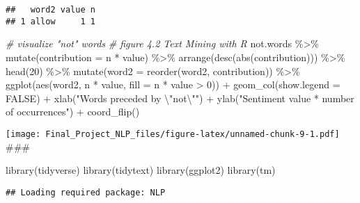 \documentclass[
]{article}
\newenvironment{Shaded}{\begin{snugshade}}{\end{snugshade}}
\newcommand{\AttributeTok}[1]{\textcolor[rgb]{0.77,0.63,0.00}{#1}}
\newcommand{\CommentTok}[1]{\textcolor[rgb]{0.56,0.35,0.01}{\textit{#1}}}
\newcommand{\ConstantTok}[1]{\textcolor[rgb]{0.00,0.00,0.00}{#1}}
\newcommand{\DecValTok}[1]{\textcolor[rgb]{0.00,0.00,0.81}{#1}}
\newcommand{\FunctionTok}[1]{\textcolor[rgb]{0.00,0.00,0.00}{#1}}
\newcommand{\NormalTok}[1]{#1}
\newcommand{\SpecialCharTok}[1]{\textcolor[rgb]{0.00,0.00,0.00}{#1}}
\newcommand{\StringTok}[1]{\textcolor[rgb]{0.31,0.60,0.02}{#1}}
\begin{document}
\begin{verbatim}
##   word2 value n
## 1 allow     1 1
\end{verbatim}

\begin{Shaded}
\begin{Highlighting}[]
\CommentTok{\# visualize "not" words}
\CommentTok{\# figure 4.2 Text Mining with R}
\NormalTok{not.words }\SpecialCharTok{\%\textgreater{}\%}
  \FunctionTok{mutate}\NormalTok{(}\AttributeTok{contribution =}\NormalTok{ n }\SpecialCharTok{*}\NormalTok{ value) }\SpecialCharTok{\%\textgreater{}\%}
  \FunctionTok{arrange}\NormalTok{(}\FunctionTok{desc}\NormalTok{(}\FunctionTok{abs}\NormalTok{(contribution))) }\SpecialCharTok{\%\textgreater{}\%}
  \FunctionTok{head}\NormalTok{(}\DecValTok{20}\NormalTok{) }\SpecialCharTok{\%\textgreater{}\%}
  \FunctionTok{mutate}\NormalTok{(}\AttributeTok{word2 =} \FunctionTok{reorder}\NormalTok{(word2, contribution)) }\SpecialCharTok{\%\textgreater{}\%}
  \FunctionTok{ggplot}\NormalTok{(}\FunctionTok{aes}\NormalTok{(word2, n }\SpecialCharTok{*}\NormalTok{ value, }\AttributeTok{fill =}\NormalTok{ n }\SpecialCharTok{*}\NormalTok{ value }\SpecialCharTok{\textgreater{}} \DecValTok{0}\NormalTok{)) }\SpecialCharTok{+}
  \FunctionTok{geom\_col}\NormalTok{(}\AttributeTok{show.legend =} \ConstantTok{FALSE}\NormalTok{) }\SpecialCharTok{+}
  \FunctionTok{xlab}\NormalTok{(}\StringTok{"Words preceded by }\SpecialCharTok{\textbackslash{}"}\StringTok{not}\SpecialCharTok{\textbackslash{}"}\StringTok{"}\NormalTok{) }\SpecialCharTok{+}
  \FunctionTok{ylab}\NormalTok{(}\StringTok{"Sentiment value * number of occurrences"}\NormalTok{) }\SpecialCharTok{+}
  \FunctionTok{coord\_flip}\NormalTok{()}
\end{Highlighting}
\end{Shaded}

\texttt{[image: Final\_Project\_NLP\_files/figure-latex/unnamed-chunk-9-1.pdf]}
\#\#\#

\begin{Shaded}
\begin{Highlighting}[]
\FunctionTok{library}\NormalTok{(tidyverse)}
\FunctionTok{library}\NormalTok{(tidytext)}
\FunctionTok{library}\NormalTok{(ggplot2)}
\FunctionTok{library}\NormalTok{(tm)}
\end{Highlighting}
\end{Shaded}

\begin{verbatim}
## Loading required package: NLP
\end{verbatim}
\end{document}
